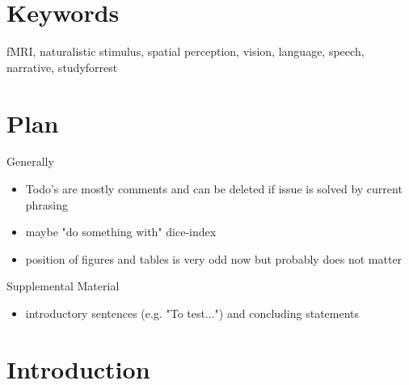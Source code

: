 \documentclass[english]{article}
\begin{document}
\section*{Keywords}
fMRI, naturalistic stimulus, spatial perception, vision, language, speech,
narrative, studyforrest

\pagebreak[4]


\section*{Plan}

\noindent Generally
\begin{itemize}
    \item Todo's are mostly comments and can be deleted if issue is solved by
        current phrasing
    \item maybe "do something with" dice-index
    \item position of figures and tables is very odd now but probably does not
        matter
\end{itemize}


\noindent Supplemental Material
\begin{itemize}
    \item introductory sentences (e.g. "To test...") and concluding statements
\end{itemize}


\pagebreak[4]


\section{Introduction}

\end{document}
